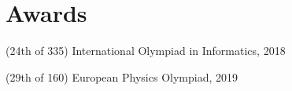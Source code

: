 \documentclass[letterpaper,11pt]{article}
\begin{document}
\section*{Awards}
\begin{description}[labelwidth=6em]
    \item[Gold medal] (24th of 335) International Olympiad in Informatics, 2018
    \item[Silver medal] (29th of 160) European Physics Olympiad, 2019
\end{description}
\end{document}
